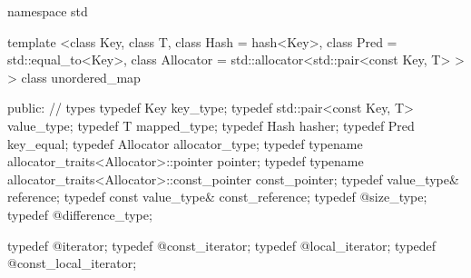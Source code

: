 \begin{codeblock}
namespace std {
  template <class Key,
            class T,
            class Hash = hash<Key>,
            class Pred = std::equal_to<Key>,
            class Allocator = std::allocator<std::pair<const Key, T> > >
  class unordered_map
  {
  public:
    // types
    typedef Key                                                 key_type;
    typedef std::pair<const Key, T>                             value_type;
    typedef T                                                   mapped_type;
    typedef Hash                                                hasher;
    typedef Pred                                                key_equal;
    typedef Allocator                                           allocator_type;
    typedef typename allocator_traits<Allocator>::pointer       pointer;
    typedef typename allocator_traits<Allocator>::const_pointer const_pointer;
    typedef value_type&                                         reference;
    typedef const value_type&                                   const_reference;
    typedef @\impdef@                              size_type;
    typedef @\impdef@                              difference_type;

    typedef @\impdef@                              iterator;
    typedef @\impdef@                              const_iterator;
    typedef @\impdef@                              local_iterator;
    typedef @\impdef@                              const_local_iterator;

}}
\end{codeblock}
